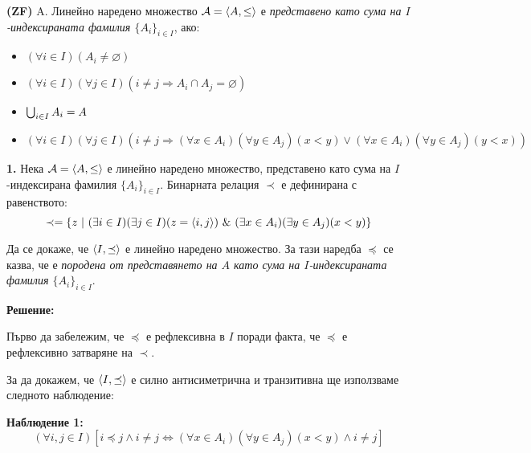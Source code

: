 \begin{problem}
\textbf{(ZF)}
A. Линейно наредено множество $\mathcal{A} = \langle A, \le \rangle$ е
\textit{представено като сума на $I$-индексираната фамилия $\{A_i\}_{i \in I}$}, ако:
\begin{itemize}
\item
$(\forall i \in I)(A_i \neq \varnothing)$
\item
$(\forall i \in I)(\forall j \in I)(i \neq j \Rightarrow A_i \cap A_j = \varnothing)$
\item
$\bigcup_{i \in I} A_i = A$
\item
$(\forall i \in I)(\forall j \in I)(i \neq j \Rightarrow (\forall x \in A_i)(\forall y \in A_j)(x < y) \lor (\forall x \in A_i)(\forall y \in A_j)(y < x))$
\end{itemize}

\quad
\textbf{1.}
Нека $\mathcal{A} = \langle A, \leq \rangle$ е линейно наредено множество,
представено като сума на $I$-индексирана фамилия $\{A_i\}_{i \in I}$.
Бинарната релация $\prec$ е дефинирана с равенството:
\[
\prec = \{z\ |\ (\exists i \in I)(\exists j \in I)(z = \pair{i, j}) \land (\exists x \in A_i)(\exists y \in A_j)(x < y)\}
\]

\quad
Да се докаже, че $\langle I, \preceq \rangle$ е линейно наредено множество.
За тази наредба $\preceq$ се казва, че е \textit{породена от представянето на $A$ като сума на
$I$-индексираната фамилия $\{A_i\}_{i \in I}$}.

\bigbreak
\textbf{Решение:}

\smallbreak
\quad
Първо да забележим, че $\preceq$ е рефлексивна в $I$ поради факта, че $\preceq$ е рефлексивно затваряне на $\prec$.

\quad
За да докажем, че $\langle I, \preceq \rangle$ е силно антисиметрична и транзитивна ще използваме следното наблюдение:

\smallbreak
\quad
\textbf{Наблюдение 1:}
\[
	(\forall i, j \in I) [i \preceq j \land i \neq j \iff (\forall x \in A_i)(\forall y \in A_j)(x < y) \land i \neq j]
\]

\begin{tcolorbox}[mybox, title={Доказателство:}]


\end{tcolorbox}
\end{problem}
